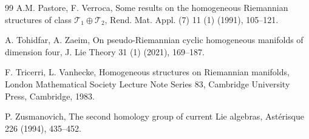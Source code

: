 \documentclass[reqno]{amsart}
\theoremstyle{definition}
\begin{document}
\begin{thebibliography}{99}
 A.M. Pastore,  F. Verroca, Some results on the homogeneous Riemannian structures of class $\mathcal{T}_{1}\oplus \mathcal{T}_{2}$, Rend. Mat. Appl. (7) 11 (1) (1991), 105--121.

 A. Tohidfar,  A. Zaeim,  On pseudo-Riemannian cyclic homogeneous manifolds of dimension four,
J. Lie Theory 31 (1) (2021), 169--187.

 F. Tricerri,  L. Vanhecke, Homogeneous structures on Riemannian manifolds, London Mathematical Society Lecture Note Series 83, Cambridge University Press, Cambridge, 1983.

 P. Zusmanovich, The second homology group of current Lie algebras, Ast\'{e}risque 226 (1994), 435--452.














\end{thebibliography}
\end{document}
